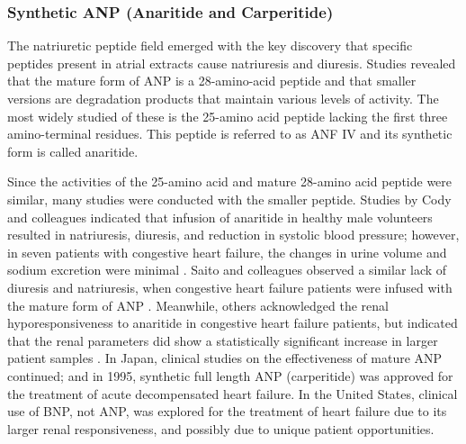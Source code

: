 \documentclass[14pt,a4paper,onecolumn]{extarticle}
\begin{document}
\subsubsection{Synthetic ANP (Anaritide and Carperitide)}
The natriuretic peptide field emerged with the key discovery that specific peptides present in atrial extracts cause natriuresis and diuresis. Studies revealed that the mature form of ANP is a 28-amino-acid peptide and that smaller versions are degradation products that maintain various levels of activity. The most widely studied of these is the 25-amino acid peptide lacking the first three amino-terminal residues. This peptide is referred to as ANF IV and its synthetic form is called anaritide.

Since the activities of the 25-amino acid and mature 28-amino acid peptide were similar, many studies were conducted with the smaller peptide. Studies by Cody and colleagues indicated that infusion of anaritide in healthy male volunteers resulted in natriuresis, diuresis, and reduction in systolic blood pressure; however, in seven patients with congestive heart failure, the changes in urine volume and sodium excretion were minimal \citep{Cody1986}. Saito and colleagues observed a similar lack of diuresis and natriuresis, when congestive heart failure patients were infused with the mature form of ANP \citep{Saito1987}.
Meanwhile, others acknowledged the renal hyporesponsiveness to anaritide in congestive heart failure patients, but indicated that the renal parameters did show a statistically significant increase in larger patient samples \citep{Fifer1990}. In Japan, clinical studies on the effectiveness of mature ANP continued; and in 1995, synthetic full length ANP (carperitide) was approved for the treatment of acute decompensated heart failure. In the United States, clinical use of BNP, not ANP, was explored for the treatment of heart failure due to its larger renal responsiveness, and possibly due to unique patient opportunities. %
\end{document}
